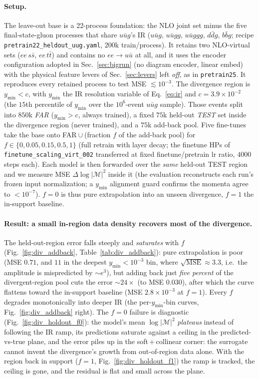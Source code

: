 \documentclass[11pt]{article}
\newcommand{\code}[1]{\texttt{#1}}
\begin{document}
\paragraph{Setup.} The leave-out base is a 22-process foundation: the NLO joint
set minus the five final-state-gluon processes that share $u\bar u g$'s IR
($u\bar u g,\,u\bar u gg,\,u\bar u ggg,\,d\bar d g,\,b\bar b g$; recipe
\code{pretrain22\_heldout\_uug.yaml}, $200$k train/process). It retains two NLO-virtual
sets ($ee\,s\bar s$, $ee\,t\bar t$) and contains no $ee\to u\bar u$ at all, and it uses the
encoder configuration adopted in Sec.~\ref{sec:bigrun} (no diagram encoder, linear embed)
with the physical feature levers of Sec.~\ref{sec:levers} left \emph{off}, as in
\code{pretrain25}. It reproduces every retained process to test MSE
$\lesssim10^{-3}$. The divergence region is $y_{\min}<c$, with $y_{\min}$ the IR
resolution variable of Eq.~\eqref{eq:ir} and $c=3.9\times10^{-2}$ (the $15$th percentile
of $y_{\min}$ over the $10^6$-event $u\bar u g$ sample). Those events split into $850$k
\emph{FAR} ($y_{\min}>c$, always trained), a fixed $75$k held-out \emph{TEST} set inside
the divergence region (never trained), and a $75$k add-back pool. Five fine-tunes take
the base onto FAR${}\cup{}$(fraction $f$ of the add-back pool) for
$f\in\{0,0.05,0.15,0.5,1\}$ (full retrain with layer decay; the finetune HPs of
\code{finetune\_scaling\_virt\_002} transferred at fixed finetune/pretrain lr ratio,
$4000$ steps each). Each model is then forwarded over the \emph{same} held-out TEST
region and we measure MSE $\Delta\log|\mathcal{M}|^2$ inside it (the evaluation
reconstructs each run's frozen input normalization; a $y_{\min}$ alignment guard
confirms the momenta agree to $<10^{-7}$). $f\!=\!0$ is thus pure extrapolation into an
unseen divergence, $f\!=\!1$ the in-support baseline.

\paragraph{Result: a small in-region data density recovers most of the divergence.}
The held-out-region error falls steeply and \emph{saturates} with $f$
(Fig.~\ref{fig:div_addback}, Table~\ref{tab:div_addback}): pure extrapolation is poor
(MSE $0.71$, and $11$ in the deepest $y_{\min}<10^{-3}$ bin, where
$\sqrt{\mathrm{MSE}}\!\approx\!3.3$, i.e.\ the amplitude is mispredicted by
$\sim\!e^{3}$), but adding back just \emph{five percent} of the divergent-region pool
cuts the error $\sim\!24\times$ (to MSE $0.030$), after which the curve flattens toward
the in-support baseline (MSE $2.8\times10^{-3}$ at $f\!=\!1$). Every $f$ degrades
monotonically into deeper IR (the per-$y_{\min}$-bin curves, Fig.~\ref{fig:div_addback}
right). The $f\!=\!0$ failure is diagnostic (Fig.~\ref{fig:div_holdout_f0}): the model's
mean $\log|\mathcal{M}|^2$ \emph{plateaus} instead of following the IR ramp, its
predictions saturate against a ceiling in the predicted-vs-true plane, and the error
piles up in the soft\,+\,collinear corner: the surrogate cannot invent the
divergence's growth from out-of-region data alone. With the region back in support
($f\!=\!1$, Fig.~\ref{fig:div_holdout_f1}) the ramp is tracked, the ceiling is gone, and
the residual is flat and small across the plane.
\end{document}
